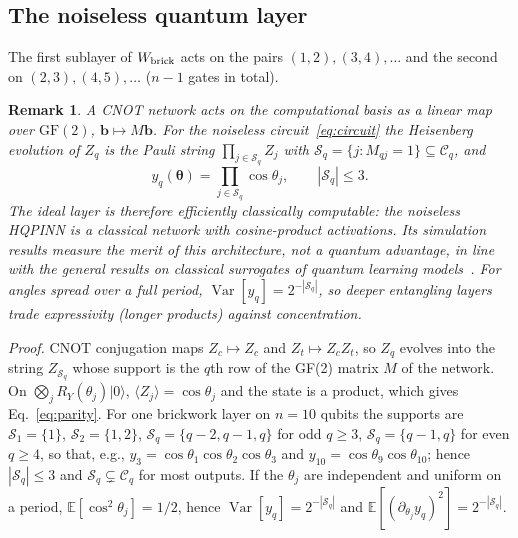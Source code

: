 \documentclass[floatfix,aps,pra,twocolumn,superscriptaddress,10pt,nofootinbib]{revtex4-2}
\newtheorem{remark}{Remark}
\begin{document}
\begin{appendices}
\subsection{The noiseless quantum layer}\label{app:parity}
The first sublayer of $W_{\rm brick}$ acts on the pairs $(1,2),(3,4),\dots$ and the second on $(2,3),(4,5),\dots$ ($n-1$ gates in total).
\begin{remark}\label{rem:parity}
    A CNOT network acts on the computational basis as a linear map over $\mathrm{GF}(2)$, $\bm b\mapsto M\bm b$. For the noiseless circuit~\eqref{eq:circuit} the Heisenberg evolution of $Z_q$ is the Pauli string $\prod_{j\in\mathcal S_q}Z_j$ with $\mathcal S_q=\{j:M_{qj}=1\}\subseteq\mathcal C_q$, and
    \begin{equation}
      y_q(\bm\theta)=\prod_{j\in\mathcal S_q}\cos\theta_j ,\qquad |\mathcal S_q|\le3 .
      \label{eq:parity}
    \end{equation}
    The ideal layer is therefore efficiently classically computable: the noiseless HQPINN is a classical network with cosine-product activations. Its simulation results measure the merit of this \emph{architecture}, not a quantum advantage, in line with the general results on classical surrogates of quantum learning models~\cite{schreiber2023classical}. For angles spread over a full period, $\operatorname{Var}[y_q]=2^{-|\mathcal S_q|}$, so deeper entangling layers trade expressivity (longer products) against concentration.
\end{remark}

\emph{Proof.} CNOT conjugation maps $Z_c\mapsto Z_c$ and $Z_t\mapsto Z_cZ_t$, so $Z_q$ evolves into the string $Z_{\mathcal S_q}$ whose support is the $q$th row of the GF(2) matrix $M$ of the network. On $\bigotimes_jR_Y(\theta_j)|0\rangle$, $\langle Z_j\rangle=\cos\theta_j$ and the state is a product, which gives Eq.~\eqref{eq:parity}. For one brickwork layer on $n=10$ qubits the supports are $\mathcal S_1=\{1\}$, $\mathcal S_2=\{1,2\}$, $\mathcal S_{q}=\{q-2,q-1,q\}$ for odd $q\ge3$, $\mathcal S_q=\{q-1,q\}$ for even $q\ge4$, so that, e.g., $y_3=\cos\theta_1\cos\theta_2\cos\theta_3$ and $y_{10}=\cos\theta_9\cos\theta_{10}$; hence $|\mathcal S_q|\le3$ and $\mathcal S_q\subsetneq\mathcal C_q$ for most outputs. If the $\theta_j$ are independent and uniform on a period, $\mathbb E[\cos^2\theta_j]=1/2$, hence $\operatorname{Var}[y_q]=2^{-|\mathcal S_q|}$ and $\mathbb E[(\partial_{\theta_j}y_q)^2]=2^{-|\mathcal S_q|}$.


\end{appendices}
\end{document}
